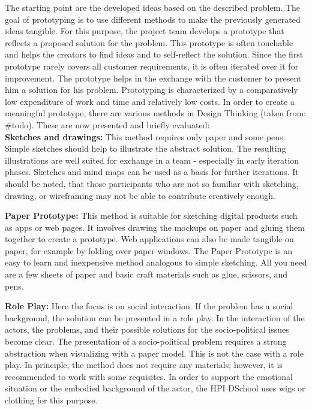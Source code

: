The starting point are the developed ideas based on the described problem. The goal of prototyping is to use different methods to make the previously generated ideas tangible. For this purpose, the project team develops a prototype that reflects a proposed solution for the problem. This prototype is often touchable and helps the creators to find ideas and to self-reflect the solution. Since the first prototype rarely covers all customer requirements, it is often iterated over it for improvement. The prototype helps in the exchange with the customer to present him a solution for his problem. Prototyping is characterized by a comparatively low expenditure of work and time and relatively low costs.
In order to create a meaningful prototype, there are various methods in Design Thinking (taken from: \#todo). These are now presented and briefly evaluated: \\

\textbf{Sketches and drawings:}	This method requires only paper and some pens. Simple sketches should help to illustrate the abstract solution. The resulting illustrations are well suited for exchange in a team - especially in early iteration phases. Sketches and mind maps can be used as a basis for further iterations. It should be noted, that those participants who are not so familiar with sketching, drawing, or wireframing may not be able to contribute creatively enough.

\textbf{Paper Prototype:} This method is suitable for sketching digital products such as apps or web pages. It involves drawing the mockups on paper and gluing them together to create a prototype. Web applications can also be made tangible on paper, for example by folding over paper windows. The Paper Prototype is an easy to learn and inexpensive method analogous to simple sketching. All you need are a few sheets of paper and basic craft materials such as glue, scissors, and pens.

\textbf{Role Play:}	Here the focus is on social interaction. If the problem has a social background, the solution can be presented in a role play. In the interaction of the actors, the problems, and their possible solutions for the socio-political issues become clear. The presentation of a socio-political problem requires a strong abstraction when visualizing with a paper model. This is not the case with a role play.
In principle, the method does not require any materials; however, it is recommended to work with some requisites. In order to support the emotional situation or the embodied background of the actor, the HPI DSchool uses wigs or clothing for this purpose.

